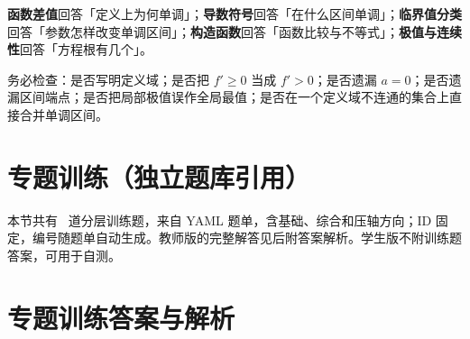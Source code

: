 \begin{knowledgebox}[title=统一的数学思路]
\textbf{函数差值}回答「定义上为何单调」；\textbf{导数符号}回答「在什么区间单调」；\textbf{临界值分类}回答「参数怎样改变单调区间」；\textbf{构造函数}回答「函数比较与不等式」；\textbf{极值与连续性}回答「方程根有几个」。
\end{knowledgebox}

务必检查：是否写明定义域；是否把 $f'\ge0$ 当成 $f'>0$；是否遗漏 $a=0$；是否遗漏区间端点；是否把局部极值误作全局最值；是否在一个定义域不连通的集合上直接合并单调区间。

\clearpage
\section{专题训练（独立题库引用）}
\noindent\textcolor{muted}{本节共有 \TrainingCount\ 道分层训练题，来自 YAML 题单，含基础、综合和压轴方向；ID 固定，编号随题单自动生成。\ifteacher 教师版的完整解答见后附答案解析。\else 学生版不附训练题答案，可用于自测。\fi}

\ifteacher
\clearpage
\section{专题训练答案与解析}
\begingroup\small\linespread{1.08}\selectfont

\endgroup
\fi
